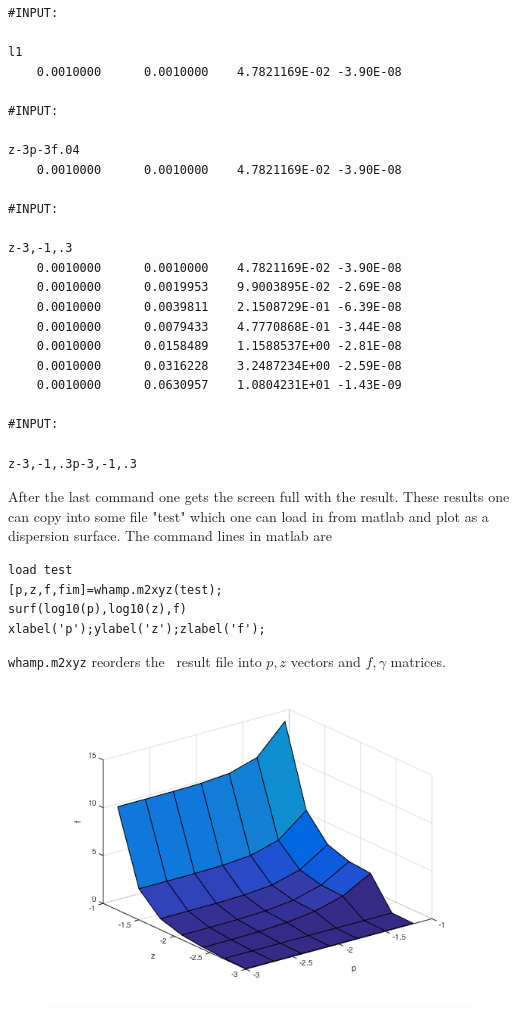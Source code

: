 \documentclass[a4,10pt]{article}
\begin{document}
\begin{verbatim}
#INPUT:

l1
    0.0010000      0.0010000    4.7821169E-02 -3.90E-08

#INPUT:

z-3p-3f.04
    0.0010000      0.0010000    4.7821169E-02 -3.90E-08

#INPUT:

z-3,-1,.3
    0.0010000      0.0010000    4.7821169E-02 -3.90E-08
    0.0010000      0.0019953    9.9003895E-02 -2.69E-08
    0.0010000      0.0039811    2.1508729E-01 -6.39E-08
    0.0010000      0.0079433    4.7770868E-01 -3.44E-08
    0.0010000      0.0158489    1.1588537E+00 -2.81E-08
    0.0010000      0.0316228    3.2487234E+00 -2.59E-08
    0.0010000      0.0630957    1.0804231E+01 -1.43E-09

#INPUT:

z-3,-1,.3p-3,-1,.3

\end{verbatim}

After the last command one gets the screen full with the result. These results one can copy into some file "test" which one can load in from matlab and plot as a dispersion surface. The command lines in matlab are

\begin{verbatim}
load test
[p,z,f,fim]=whamp.m2xyz(test);
surf(log10(p),log10(z),f)
xlabel('p');ylabel('z');zlabel('f');
\end{verbatim}

\texttt{whamp.m2xyz} reorders the \WHAMP\ result file into $p,z$ vectors and $f,\gamma$ matrices.

\begin{figure}[htb]
  \begin{center}
    \includegraphics[width=.7\linewidth]{disp_surf_Ex1}
  \end{center}
\centering
\label{fig:disp}
\end{figure}
\end{document}
